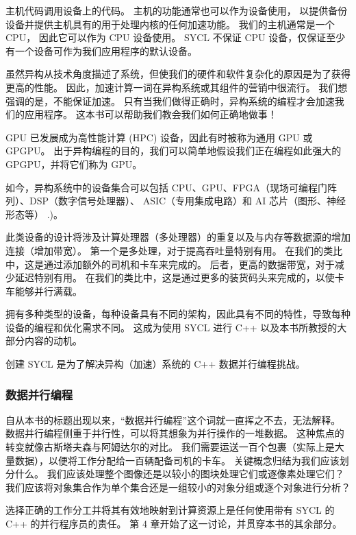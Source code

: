 \begin{remark}
	主机代码调用设备上的代码。 主机的功能通常也可以作为设备使用，
	以提供备份设备并提供主机具有的用于处理内核的任何加速功能。 我们的主机通常是一个 CPU，
	因此它可以作为 CPU 设备使用。 SYCL 不保证 CPU 设备，仅保证至少有一个设备可作为我们应用程序的默认设备。
\end{remark}

虽然异构从技术角度描述了系统，但使我们的硬件和软件复杂化的原因是为了获得更高的性能。 
因此，加速计算一词在异构系统或其组件的营销中很流行。 我们想强调的是，不能保证加速。 
只有当我们做得正确时，异构系统的编程才会加速我们的应用程序。 这本书可以帮助我们教会我们如何正确地做事！

GPU 已发展成为高性能计算 (HPC) 设备，因此有时被称为通用 GPU 或 GPGPU。 
出于异构编程的目的，我们可以简单地假设我们正在编程如此强大的 GPGPU，并将它们称为 GPU。

如今，异构系统中的设备集合可以包括 CPU、GPU、FPGA（现场可编程门阵列）、DSP（数字信号处理器）、
ASIC（专用集成电路）和 AI 芯片（图形、神经形态等） .)。

此类设备的设计将涉及计算处理器（多处理器）的重复以及与内存等数据源的增加连接（增加带宽）。 
第一个是多处理，对于提高吞吐量特别有用。 在我们的类比中，这是通过添加额外的司机和卡车来完成的。 
后者，更高的数据带宽，对于减少延迟特别有用。 在我们的类比中，这是通过更多的装货码头来完成的，以使卡车能够并行满载。

拥有多种类型的设备，每种设备具有不同的架构，因此具有不同的特性，导致每种设备的编程和优化需求不同。 
这成为使用 SYCL 进行 C++ 以及本书所教授的大部分内容的动机。

\begin{remark}
	创建 SYCL 是为了解决异构（加速）系统的 C++ 数据并行编程挑战。
\end{remark}

\subsubsection{数据并行编程}

自从本书的标题出现以来，“数据并行编程”这个词就一直挥之不去，无法解释。 
数据并行编程侧重于并行性，可以将其想象为并行操作的一堆数据。 这种焦点的转变就像古斯塔夫森与阿姆达尔的对比。 
我们需要运送一百个包裹（实际上是大量数据），以便将工作分配给一百辆配备司机的卡车。 关键概念归结为我们应该划分什么。 
我们应该处理整个图像还是以较小的图块处理它们或逐像素处理它们？ 
我们应该将对象集合作为单个集合还是一组较小的对象分组或逐个对象进行分析？

选择正确的工作分工并将其有效地映射到计算资源上是任何使用带有 SYCL 的 C++ 的并行程序员的责任。 
第 4 章开始了这一讨论，并贯穿本书的其余部分。

